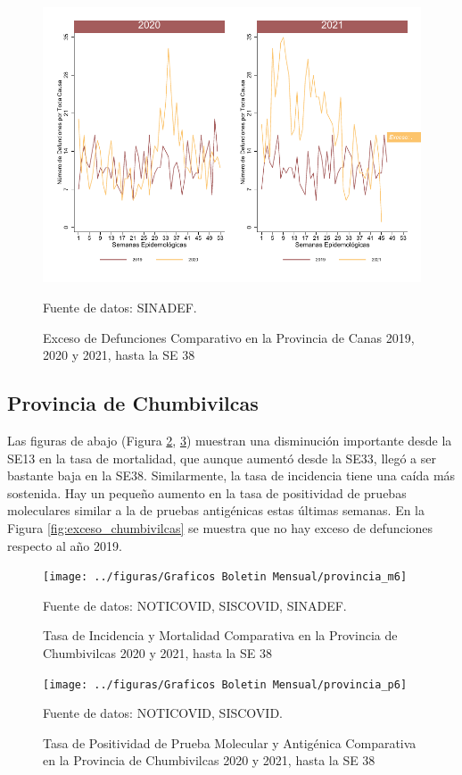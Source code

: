 \documentclass[12pt,a4paper,openany]{book}
\begin{document}
	\begin{figure}[h]
	\caption{Exceso de Defunciones Comparativo en la Provincia de Canas 2019, 2020 y 2021, hasta la SE 38}\label{fig:exceso_canchis}
	\begin{center}
		\includegraphics[width=0.7\linewidth]{../figuras/exceso_5}
	\end{center}
	{\footnotesize {Fuente de datos: SINADEF.}}
	\end{figure}

\clearpage

	\subsection*{Provincia de Chumbivilcas}
	\noindent Las figuras de abajo (Figura \ref{fig:inc_mort_chumbivilcas}, \ref{fig:positividad_chumbivilcas})  muestran una disminución importante desde la SE13 en la tasa de mortalidad, que aunque aumentó desde la SE33, llegó a ser bastante baja en la SE38. Similarmente, la tasa de incidencia tiene una caída más sostenida. Hay un pequeño aumento en la tasa de positividad de pruebas moleculares similar a la de pruebas antigénicas estas últimas semanas. En la Figura \ref{fig:exceso_chumbivilcas} se muestra que no hay exceso de defunciones respecto al año 2019.

	\begin{figure}[h]
	\caption{Tasa de Incidencia y Mortalidad Comparativa en la Provincia de Chumbivilcas 2020 y 2021, hasta la SE 38}\label{fig:inc_mort_chumbivilcas}
	\begin{center}
		\texttt{[image: ../figuras/Graficos Boletin Mensual/provincia\_m6]}
	\end{center}
	{\footnotesize {Fuente de datos: NOTICOVID, SISCOVID, SINADEF.}}
	\end{figure}

	\begin{figure}[h]
	\caption{Tasa de Positividad de Prueba Molecular y Antigénica Comparativa en la Provincia de Chumbivilcas 2020 y 2021, hasta la SE 38}\label{fig:positividad_chumbivilcas}
	\begin{center}
		\texttt{[image: ../figuras/Graficos Boletin Mensual/provincia\_p6]}
	\end{center}
	{\footnotesize {Fuente de datos: NOTICOVID, SISCOVID.}}
	\end{figure}
\end{document}
